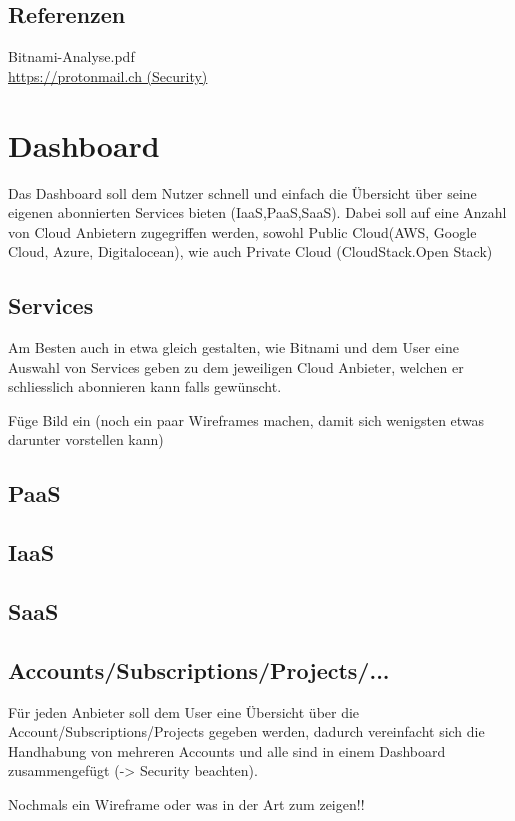 \documentclass[11pt]{scrartcl}
\begin{document}
\subsection{Referenzen}
Bitnami-Analyse.pdf\\
\href{https://protonmail.ch}{https://protonmail.ch (Security)} 

\section{Dashboard}
Das Dashboard soll dem Nutzer schnell und einfach die Übersicht über seine 
eigenen abonnierten Services bieten (IaaS,PaaS,SaaS).
Dabei soll auf eine Anzahl von Cloud Anbietern zugegriffen werden, sowohl Public 
Cloud(AWS, Google Cloud, Azure, Digitalocean), wie auch Private Cloud (CloudStack.Open Stack)

\subsection{Services}
Am Besten auch in etwa gleich gestalten, wie Bitnami und dem User eine Auswahl 
von Services geben zu dem jeweiligen Cloud Anbieter, welchen er schliesslich 
abonnieren kann falls gewünscht.

Füge Bild ein (noch ein paar Wireframes machen, damit sich wenigsten etwas darunter vorstellen kann)

\subsection{PaaS}


\subsection{IaaS}

\subsection{SaaS}

\subsection{Accounts/Subscriptions/Projects/...}
Für jeden Anbieter soll dem User eine Übersicht über die 
Account/Subscriptions/Projects gegeben werden, dadurch vereinfacht sich die 
Handhabung von mehreren Accounts und alle sind in einem Dashboard zusammengefügt 
(-> Security beachten).

Nochmals ein Wireframe oder was in der Art zum zeigen!!
\end{document}
